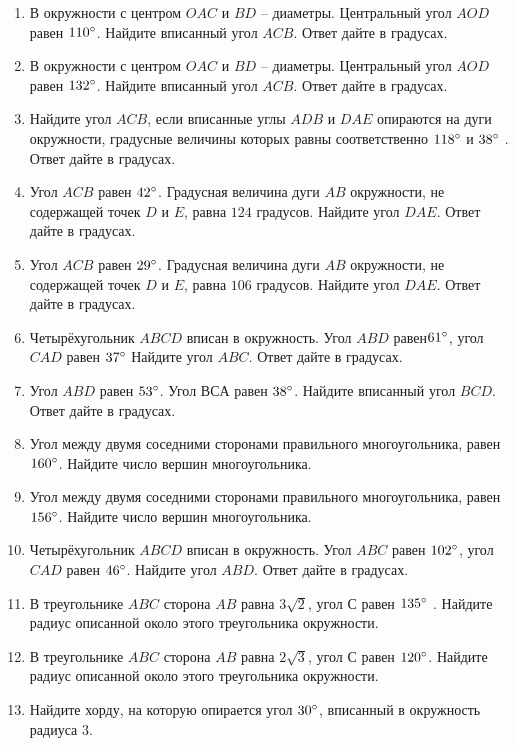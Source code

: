 \documentclass[12pt, a4paper]{article}
\begin{document}
\begin{enumerate}
		\item В окружности с центром \(O AC\) и \( BD \) – диаметры. Центральный угол \( AOD \) равен \( 110\degree\). Найдите вписанный угол \( ACB \). Ответ дайте в градусах.
		\item В окружности с центром \( O AC \) и \( BD \) – диаметры. Центральный угол \( AOD \)  равен \( 132 \degree \). Найдите вписанный угол \( ACB \). Ответ дайте в градусах.
		\item Найдите угол \( ACB \), если вписанные углы \( ADB \) и \( DAE \) опираются на дуги окружности, градусные величины которых равны соответственно \( 118 \degree \)  и \(  38 \degree \) . Ответ дайте в градусах.
		\item Угол \( ACB \)  равен \( 42 \degree \). Градусная величина дуги \( AB \)  окружности, не содержащей точек \( D \)  и \( E \), равна \( 124 \) градусов. Найдите угол \( DAE \). Ответ дайте в градусах.
		\item Угол \( ACB \)  равен \( 29 \degree \). Градусная величина дуги \( AB \)  окружности, не содержащей точек \( D \)  и \( E \), равна \( 106 \) градусов. Найдите угол \( DAE \). Ответ дайте в градусах.
		\item Четырёхугольник \( ABCD \)  вписан в окружность. Угол \( ABD \)  равен\(  61\degree \), угол \( CAD \)  равен \( 37\degree \)  Найдите угол \( ABC \). Ответ дайте в градусах.
		\item Угол \( ABD \)  равен \( 53\degree \). Угол \( ВСА \)  равен \( 38\degree \). Найдите вписанный угол \( BCD \). Ответ дайте в градусах.
		\item Угол между двумя соседними сторонами правильного многоугольника, равен \( 160\degree \). Найдите число вершин многоугольника.
		\item Угол между двумя соседними сторонами правильного многоугольника, равен \( 156\degree\). Найдите число вершин многоугольника.
		\item Четырёхугольник \( ABCD \)  вписан в окружность. Угол \( ABC \)  равен \( 102\degree\), угол \( CAD \)  равен \( 46\degree \). Найдите угол \( ABD \). Ответ дайте в градусах.
		\item В треугольнике \( ABC \)  сторона \( AB  \) равна \( 3\sqrt{2} \), угол \( С \)  равен \( 135\degree\) . Найдите радиус описанной около этого треугольника окружности.
		\item В треугольнике \( ABC  \) сторона \( AB  \) равна \( 2\sqrt{3} \), угол \( С \)  равен \( 120\degree\). Найдите радиус описанной около этого треугольника окружности.
		\item Найдите хорду, на которую опирается угол \( 30\degree \), вписанный в окружность радиуса \( 3 \).

\end{enumerate}
\end{document}
